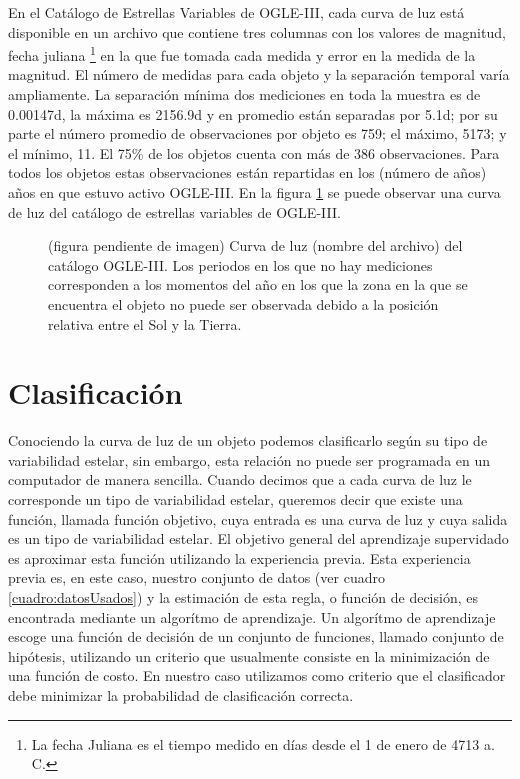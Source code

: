 \documentclass[letterpaper,12pt]{book}
\begin{document}
En el Catálogo de Estrellas Variables de OGLE-III, cada curva de luz está disponible en un archivo que contiene tres columnas con los valores de magnitud, fecha juliana \footnote{La fecha Juliana es el tiempo medido en días desde el 1 de enero de 4713 a. C.} en la que fue tomada cada medida y error en la medida de la magnitud. El número de medidas para cada objeto y la separación temporal varía ampliamente. La separación mínima dos mediciones en toda la muestra es de 0.00147d, la máxima es 2156.9d y en promedio están separadas por 5.1d; por su parte el número promedio de observaciones por objeto es 759; el máximo, 5173; y el mínimo,  11. El 75\% de los objetos cuenta con más de 386 observaciones. Para todos los objetos estas observaciones están repartidas en los (número de años) años en que estuvo activo OGLE-III. En la figura \ref{fig:curvaDeLuz} se puede observar una curva de luz del catálogo de estrellas variables de OGLE-III.    

\begin{figure}
  \label{fig:curvaDeLuz}
  \caption{(figura pendiente de imagen) Curva de luz (nombre del archivo) del catálogo OGLE-III. Los periodos en los que no hay mediciones corresponden a los momentos del año en los que la zona en la que se encuentra el objeto no puede ser observada debido a la posición relativa entre el Sol y la Tierra.}
\end{figure}

\chapter{Clasificación}\label{cap:clasificacion} 

Conociendo la curva de luz de un objeto podemos clasificarlo según su tipo de variabilidad estelar, sin embargo, esta relación no puede ser programada en un computador de manera sencilla. Cuando decimos que a cada curva de luz le corresponde un tipo de variabilidad estelar, queremos decir que existe una función, llamada función objetivo, cuya entrada es una curva de luz y cuya salida es un tipo de variabilidad estelar. El objetivo general del aprendizaje supervidado es aproximar esta función utilizando la experiencia previa. Esta experiencia previa es, en este caso, nuestro conjunto de datos (ver cuadro \ref{cuadro:datosUsados}) y la estimación de esta regla, o función de decisión, es encontrada mediante un algorítmo de aprendizaje. Un algorítmo de aprendizaje escoge una función de decisión de un conjunto de funciones, llamado conjunto de hipótesis, utilizando un criterio que usualmente consiste en la minimización de una función de costo. En nuestro caso utilizamos como criterio que el clasificador debe minimizar la probabilidad de clasificación correcta.
\end{document}
